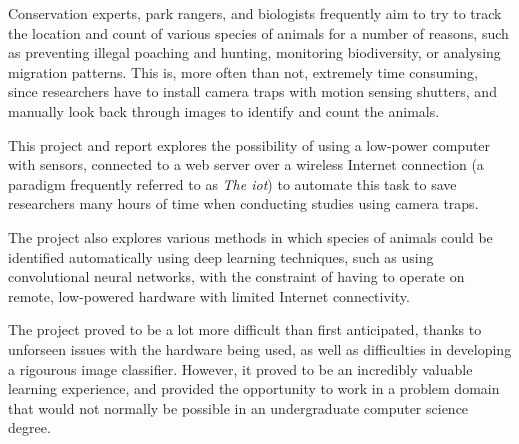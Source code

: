 Conservation experts, park rangers, and biologists frequently aim to try to
track the location and count of various species of animals for a number of
reasons, such as preventing illegal poaching and hunting, monitoring
biodiversity, or analysing migration patterns. This is, more often than not,
extremely time consuming, since researchers have to install camera traps with
motion sensing shutters, and manually look back through images to identify
and count the animals.

This project and report explores the possibility of using a low-power
computer with sensors, connected to a web server over a wireless Internet
connection (a paradigm frequently referred to as \textit{The \acrfull{iot}})
to automate this task to save researchers many hours of time when conducting
studies using camera traps.

The project also explores various methods in which species of animals could
be identified automatically using deep learning techniques, such as using
convolutional neural networks, with the constraint of having to operate on
remote, low-powered hardware with limited Internet connectivity.

The project proved to be a lot more difficult than first anticipated, thanks
to unforseen issues with the hardware being used, as well as difficulties in
developing a rigourous image classifier. However, it proved to be an
incredibly valuable learning experience, and provided the opportunity to work
in a problem domain that would not normally be possible in an undergraduate
computer science degree.